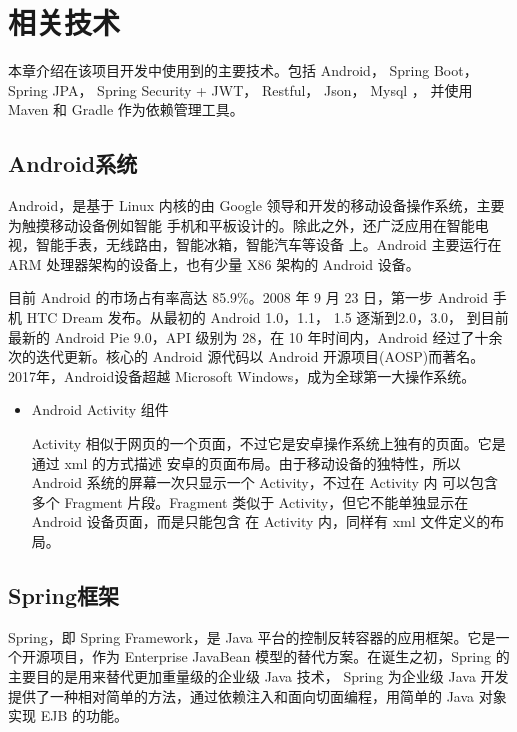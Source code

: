
\chapter{相关技术}%
本章介绍在该项目开发中使用到的主要技术。包括 Android， Spring Boot， Spring JPA， Spring Security + JWT， 
Restful， Json， Mysql ， 并使用 Maven 和 Gradle 作为依赖管理工具。

\section{Android系统}
Android\cite{Android}，是基于 Linux 内核的由 Google 领导和开发的移动设备操作系统，主要为触摸移动设备例如智能
手机和平板设计的。除此之外，还广泛应用在智能电视，智能手表，无线路由，智能冰箱，智能汽车等设备
上。Android 主要运行在 ARM 处理器架构的设备上，也有少量 X86 架构的 Android 设备。

目前 Android 的市场占有率高达 85.9\%。2008 年 9 月 23 日，第一步 Android 手机 HTC Dream 发布。从最初的 Android 1.0，1.1，
 1.5 逐渐到2.0，3.0， 到目前最新的 Android Pie 9.0，API 级别为 28，在 10 年时间内，Android 经过了十余
 次的迭代更新。核心的 Android 源代码以 Android 开源项目(AOSP)而著名。2017年，Android设备超越 Microsoft Windows，成为全球第一大操作系统。

\begin{itemize}
    \item Android Activity 组件
    
    Activity\cite{Activity} 相似于网页的一个页面，不过它是安卓操作系统上独有的页面。它是通过 xml 的方式描述
    安卓的页面布局。由于移动设备的独特性，所以 Android 系统的屏幕一次只显示一个 Activity，不过在 Activity 内
    可以包含多个 Fragment 片段。Fragment 类似于 Activity，但它不能单独显示在 Android 设备页面，而是只能包含
    在 Activity 内，同样有 xml 文件定义的布局。

\end{itemize}



 \section{Spring框架}
Spring，即 Spring Framework\cite{SpringFramework}，是 Java 平台的控制反转容器的应用框架。它是一个开源项目，作为 Enterprise
JavaBean 模型的替代方案。在诞生之初，Spring 的主要目的是用来替代更加重量级的企业级 Java 技术\cite{SpringInAction}，
Spring 为企业级 Java 开发提供了一种相对简单的方法，通过依赖注入和面向切面编程，用简单的 Java 对象
实现 EJB 的功能。

